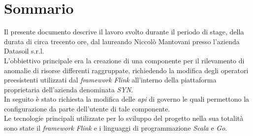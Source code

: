 
\cleardoublepage
{}
{}
\begingroup
\let\clearpage\relax
\let\cleardoublepage\relax
\let\cleardoublepage\relax

\chapter*{Sommario}

Il presente documento descrive il lavoro svolto durante il periodo di stage, della durata di circa trecento ore, dal laureando Niccolò Mantovani presso l'azienda Datasoil s.r.l.\\
L'obbiettivo principale era la creazione di una componente per il rilevamento di anomalie di risorse differenti raggruppate, richiedendo la modifica degli operatori preesistenti utilizzati dal \textit{\textit{\gls{framework}}} \textit{Flink} all'interno della piattaforma proprietaria dell'azienda denominata \textit{SYN}.\\
In seguito è stato richiesta la modifica delle \textit{\gls{api}} di governo le quali permettono la configurazione da parte dell'utente di tale componente.\\
Le tecnologie principali utilizzate per lo sviluppo del progetto nella sua totalità sono state il \textit{\textit{\gls{framework}}} \textit{Flink} e i linguaggi di programmazione \textit{Scala} e \textit{Go}.

%
%

\endgroup			

\vfill

